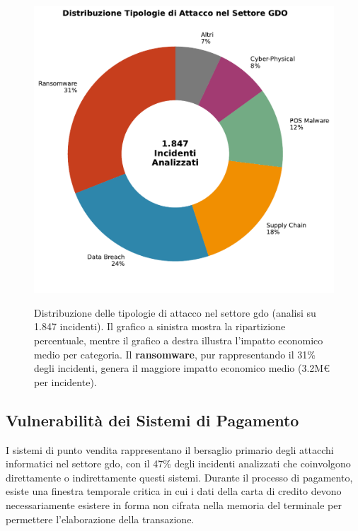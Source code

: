 \begin{figure}[htbp]
\centering
\includegraphics[width=\textwidth]{thesis_figures/cap2/fig_2_2_attack_types.pdf}
\caption[Distribuzione delle tipologie di attacco nel settore GDO]{Distribuzione delle tipologie di attacco nel settore \gls{gdo} (analisi su 1.847 incidenti). Il grafico a sinistra mostra la ripartizione percentuale, mentre il grafico a destra illustra l'impatto economico medio per categoria. Il \textbf{\gls{ransomware}}, pur rappresentando il 31\% degli incidenti, genera il maggiore impatto economico medio (3.2M€ per incidente).}\autocite{CPR2025}
\label{fig:attack_types}
\end{figure}

\subsection{\texorpdfstring{Vulnerabilità dei Sistemi di Pagamento}{2.3.1 - Vulnerabilità dei Sistemi di Pagamento}}

I sistemi di punto vendita rappresentano il bersaglio primario degli attacchi informatici nel settore \gls{gdo}, con il 47\% degli incidenti analizzati che coinvolgono direttamente o indirettamente questi sistemi. Durante il processo di pagamento, esiste una finestra temporale critica in cui i dati della carta di credito devono necessariamente esistere in forma non cifrata nella memoria del terminale per permettere l'elaborazione della transazione.

